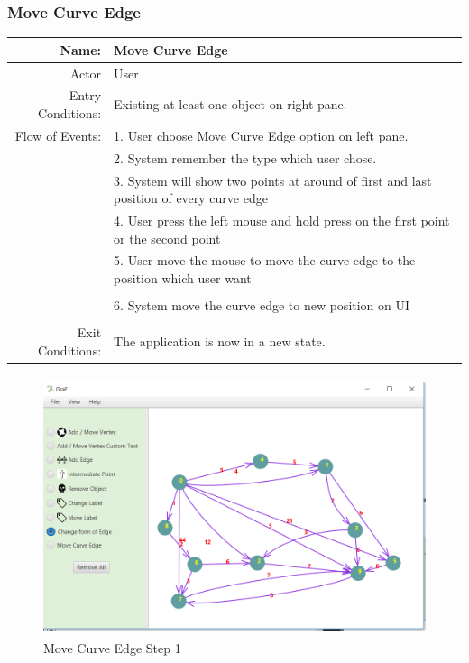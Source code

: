 \documentclass[a4paper,10pt]{article}
\begin{document}
\subsubsection{Move Curve Edge}
	\begin{tabular}{|r|l|}
\hline
Name: & Move Curve Edge \\
\hline
Actor & User \\
\hline
Entry Conditions: & Existing at least one object on right pane. \\
\hline
Flow of Events: & 1. User choose Move Curve Edge option on left pane. \\
& 2. System remember the type which user chose.  \\
& 3. System will show two points at around of first and last position of every curve edge \\
& 4. User press the left mouse and hold press on the first point or the second point\\
& 5. User move the mouse to move the curve edge to the position which user want\\
\\
& 6. System move the curve edge to new position on UI\\
\\
\hline
Exit Conditions: & The application is now in a new state. \\
\hline

\end{tabular}
\begin{figure}[H]
		\centering
		\includegraphics[height = 3in]{moveCurveEdge1.png}
		\caption[Optional caption]{Move Curve Edge Step 1}
		\label{fig:Repository}
	\end{figure}
\end{document}
